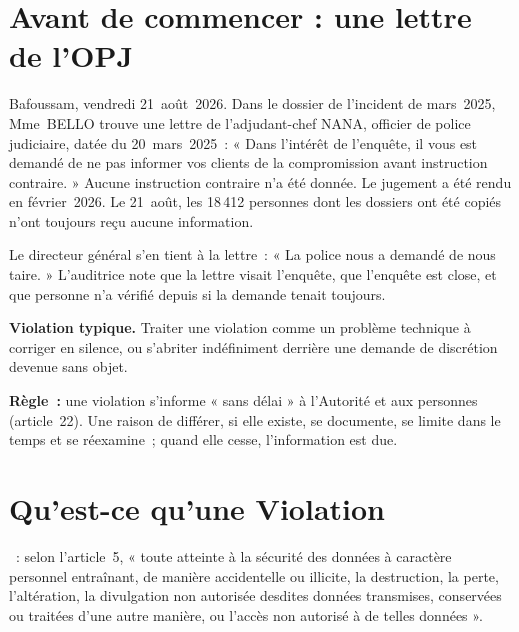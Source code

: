 \section*{Avant de commencer : une lettre de l'OPJ}

Bafoussam, vendredi 21~août~2026. Dans le dossier de l'incident de
mars~2025, Mme~BELLO trouve une lettre de l'adjudant-chef NANA, officier
de police judiciaire, datée du 20~mars~2025~: « Dans l'intérêt de
l'enquête, il vous est demandé de ne pas informer vos clients de la
compromission avant instruction contraire. » Aucune instruction contraire
n'a été donnée. Le jugement a été rendu en février~2026. Le 21~août, les
18\,412 personnes dont les dossiers ont été copiés n'ont toujours reçu
aucune information.

Le directeur général s'en tient à la lettre~: « La police nous a demandé de
nous taire. » L'auditrice note que la lettre visait l'enquête, que
l'enquête est close, et que personne n'a vérifié depuis si la demande
tenait toujours.

\begin{boxalert}
\textbf{Violation typique.} Traiter une violation comme un problème
technique à corriger en silence, ou s'abriter indéfiniment derrière une
demande de discrétion devenue sans objet.

\smallskip
\textbf{Règle~:} une violation s'informe « sans délai » à l'Autorité et aux
personnes (article~22). Une raison de différer, si elle existe, se
documente, se limite dans le temps et se réexamine~; quand elle cesse,
l'information est due.
\end{boxalert}

\section{Qu'est-ce qu'une Violation}
\label{sec:c12-definition}

\begin{boxdef}
~: selon l'article~5,
« toute atteinte à la sécurité des données à caractère personnel
entraînant, de manière accidentelle ou illicite, la destruction, la perte,
l'altération, la divulgation non autorisée desdites données transmises,
conservées ou traitées d'une autre manière, ou l'accès non autorisé à de
telles données ».
\end{boxdef}

